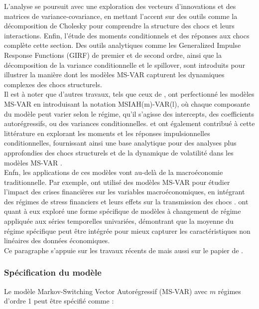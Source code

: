 \begin{sloppypar}
L'analyse se poursuit avec une exploration des vecteurs d'innovations et des matrices de variance-covariance, en mettant l'accent sur des outils comme la décomposition de Cholesky pour comprendre la structure des chocs et leurs interactions. Enfin, l'étude des moments conditionnels et des réponses aux chocs complète cette section. Des outils analytiques comme les Generalized Impulse Response Functions (GIRF) de premier et de second ordre, ainsi que la décomposition de la variance conditionnelle et le spillover, sont introduits pour illustrer la manière dont les modèles MS-VAR capturent les dynamiques complexes des chocs structurels.
\\

Il est à noter que d'autres travaux, tels que ceux de \cite[1997]{Krolzig}, ont perfectionné les modèles MS-VAR en introduisant la notation MSIAH(m)-VAR(l), où chaque composante du modèle peut varier selon le régime, qu'il s'agisse des intercepts, des coefficients autorégressifs, ou des variances conditionnelles. \cite[2015]{Bianchi} et \cite[2013]{Bianchi et Civelli} ont également contribué à cette littérature en explorant les moments et les réponses impulsionnelles conditionnelles, fournissant ainsi une base analytique pour des analyses plus approfondies des chocs structurels et de la dynamique de volatilité dans les modèles MS-VAR .
\\

Enfn, les applications de ces modèles vont au-delà de la macroéconomie traditionnelle. Par exemple, \cite[2014]{Hubrich et Tetlow} ont utilisé des modèles MS-VAR pour étudier l'impact des crises financières sur les variables macroéconomiques, en intégrant des régimes de stress financiers et leurs effets sur la transmission des chocs . \cite[2012]{Ang et Timmermann} ont quant à eux exploré une forme spécifique de modèles à changement de régime appliquée aux séries temporelles univariées, démontrant que la moyenne du régime spécifique peut être intégrée pour mieux capturer les caractéristiques non linéaires des données économiques.\\

Ce paragraphe s'appuie sur les travaux récents de \cite[2023]{Kole et Van Dijk} mais aussi sur le papier de \cite[2013]{Binder et Gross}. 

\subsubsection{Spécification du modèle}

Le modèle Markov-Switching Vector Autorégressif (MS-VAR) avec $m$ régimes d'ordre 1 peut être spécifié comme :


\end{sloppypar}
